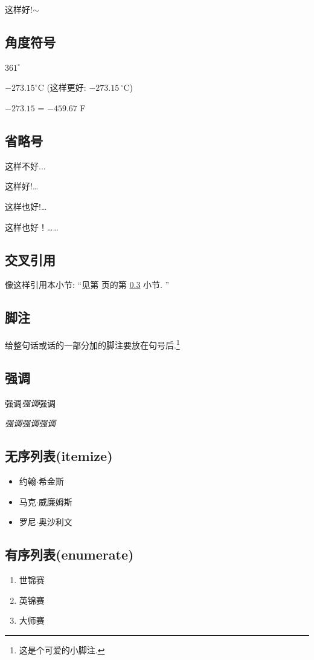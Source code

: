 \documentclass{ctexart}
\begin{document}
    这样好!$\sim$
    \subsection{角度符号}
    $361^{\circ}$

    $-273.15^{\circ}\mathrm{C}$ (这样更好: $-273.15\,^{\circ}\mathrm{C}$)

    $-273.15$ \textcelsius{} = $-459.67$ \textdegree{}F
    \subsection{省略号}
    这样不好...

    这样好!\dots

    这样也好!\ldots

    这样也好！……
    \subsection{交叉引用}\label{ref}
    像这样引用本小节: ``见第 \pageref{ref} 页的第 \ref{ref} 小节. ''
    \subsection{脚注}
    给整句话或话的一部分加的脚注要放在句号后.\footnote{这是个可爱的小脚注.}
    \subsection{强调}
    强调\emph{强调}强调

    \textit{强调\emph{强调}强调}
    \subsection{无序列表(itemize)}
    \begin{itemize}
        \item 约翰$\cdot$希金斯
        \item 马克$\cdot$威廉姆斯
        \item 罗尼$\cdot$奥沙利文
    \end{itemize}
    \subsection{有序列表(enumerate)}
    \begin{enumerate}
        \item 世锦赛
        \item 英锦赛
        \item 大师赛
    \end{enumerate}
\end{document}
